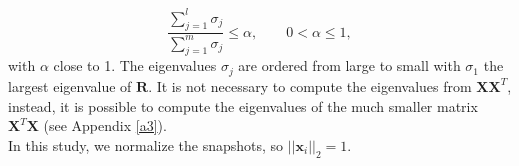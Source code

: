\documentclass[12pt]{article}
\numberwithin{equation}{section}
\begin{document}
\begin{equation}
\frac{\sum_{j=1}^l\sigma_j}{\sum_{j=1}^m\sigma_j}\leq \alpha, \qquad 0<\alpha \leq 1,
\end{equation}
with $\alpha$ close to 1. The eigenvalues $\sigma_j$ are ordered from large to small with $\sigma_1$
the largest eigenvalue of $\mathbf{R}$. 
It is not necessary to compute the eigenvalues from $\mathbf{X}\mathbf{X}^T$, instead, it is possible to compute the eigenvalues of the much smaller matrix $\mathbf{X}^T\mathbf{X}$ (see Appendix \ref{a3}). \\
In this study, we normalize the snapshots, so $||\mathbf{x}_i||_2=1.$

\newpage
\end{document}
